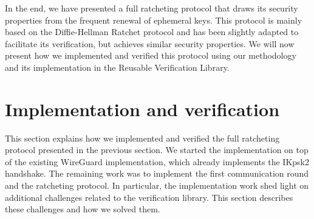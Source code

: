 
In the end, we have presented a full ratcheting protocol that draws its security properties from the frequent renewal of ephemeral keys. This protocol is mainly based on the Diffie-Hellman Ratchet protocol and has been slightly adapted to facilitate its verification, but achieves similar security properties.
We will now present how we implemented and verified this protocol using our methodology and its implementation in the Reusable Verification Library. 

\section{Implementation and verification}
\label{sec:implementation-and-verification}

This section explains how we implemented and verified the full ratcheting protocol presented in the previous section.
We started the implementation on top of the existing WireGuard implementation, which already implements the IKpsk2 handshake.
The remaining work was to implement the first communication round and the ratcheting protocol.
In particular, the implementation work shed light on additional challenges related to the verification library. This section describes these challenges and how we solved them.

